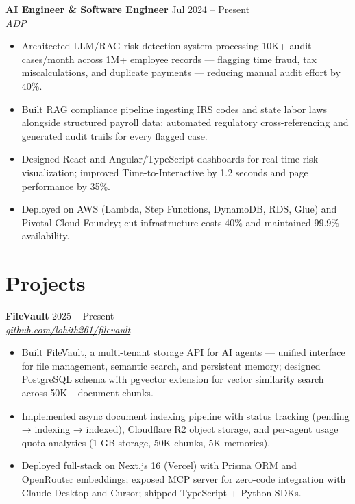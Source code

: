 \documentclass[10pt,letterpaper]{article}
\newcommand{\entry}[3]{%
  \vspace{3pt}\textbf{#1} \hfill #3 \\
  \textit{\small #2}\vspace{1pt}}
\begin{document}
\entry{AI Engineer \& Software Engineer}{ADP}{Jul 2024 -- Present}
\begin{itemize}
  \item Architected LLM/RAG risk detection system processing 10K+ audit cases/month across 1M+ employee records --- flagging time fraud, tax miscalculations, and duplicate payments --- reducing manual audit effort by 40\%.
  \item Built RAG compliance pipeline ingesting IRS codes and state labor laws alongside structured payroll data; automated regulatory cross-referencing and generated audit trails for every flagged case.
  \item Designed React and Angular/TypeScript dashboards for real-time risk visualization; improved Time-to-Interactive by 1.2 seconds and page performance by 35\%.
  \item Deployed on AWS (Lambda, Step Functions, DynamoDB, RDS, Glue) and Pivotal Cloud Foundry; cut infrastructure costs 40\% and maintained 99.9\%+ availability.
\end{itemize}

\section{Projects}

\entry{FileVault}{\href{https://github.com/lohith261/filevault}{github.com/lohith261/filevault}}{2025 -- Present}
\begin{itemize}
  \item Built FileVault, a multi-tenant storage API for AI agents --- unified interface for file management, semantic search, and persistent memory; designed PostgreSQL schema with pgvector extension for vector similarity search across 50K+ document chunks.
  \item Implemented async document indexing pipeline with status tracking (pending → indexing → indexed), Cloudflare R2 object storage, and per-agent usage quota analytics (1 GB storage, 50K chunks, 5K memories).
  \item Deployed full-stack on Next.js 16 (Vercel) with Prisma ORM and OpenRouter embeddings; exposed MCP server for zero-code integration with Claude Desktop and Cursor; shipped TypeScript + Python SDKs.
\end{itemize}
\end{document}
